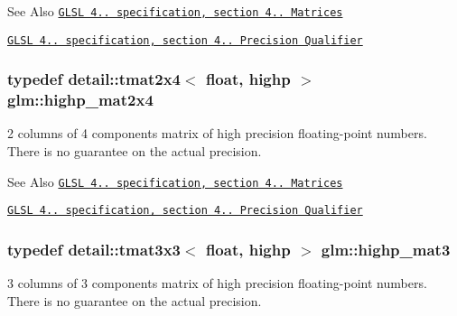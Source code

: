 \begin{DoxySeeAlso}{See Also}
\href{http://www.opengl.org/registry/doc/GLSLangSpec.4.20.8.pdf}{\tt G\-L\-S\-L 4.. specification, section 4.. Matrices} 

\href{http://www.opengl.org/registry/doc/GLSLangSpec.4.20.8.pdf}{\tt G\-L\-S\-L 4.. specification, section 4.. Precision Qualifier} 
\end{DoxySeeAlso}
\hypertarget{group__core__precision_ga3cc506666b7a95db56f9d2eb787b6e20}{
\subsubsection[{highp\-\_\-mat2x4}]{\setlength{\rightskip}{0pt plus 5cm}typedef detail\-::tmat2x4$<$ float, highp $>$ {\bf glm\-::highp\-\_\-mat2x4}}}\label{group__core__precision_ga3cc506666b7a95db56f9d2eb787b6e20}
2 columns of 4 components matrix of high precision floating-\/point numbers. There is no guarantee on the actual precision.

\begin{DoxySeeAlso}{See Also}
\href{http://www.opengl.org/registry/doc/GLSLangSpec.4.20.8.pdf}{\tt G\-L\-S\-L 4.. specification, section 4.. Matrices} 

\href{http://www.opengl.org/registry/doc/GLSLangSpec.4.20.8.pdf}{\tt G\-L\-S\-L 4.. specification, section 4.. Precision Qualifier} 
\end{DoxySeeAlso}
\hypertarget{group__core__precision_ga334034520a655db41a2e188951f6aaad}{
\subsubsection[{highp\-\_\-mat3}]{\setlength{\rightskip}{0pt plus 5cm}typedef detail\-::tmat3x3$<$ float, highp $>$ {\bf glm\-::highp\-\_\-mat3}}}\label{group__core__precision_ga334034520a655db41a2e188951f6aaad}
3 columns of 3 components matrix of high precision floating-\/point numbers. There is no guarantee on the actual precision.

